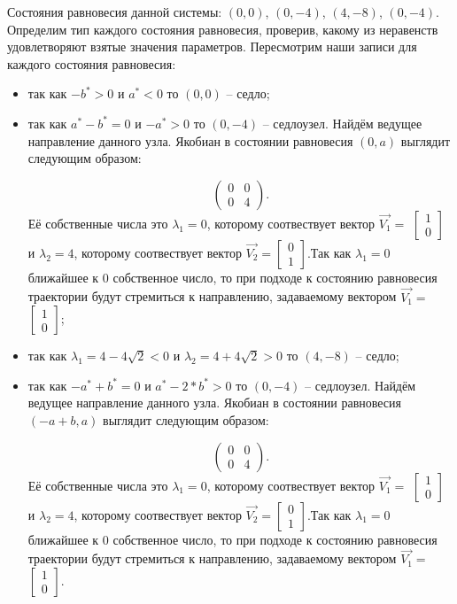 Состояния равновесия данной системы: $(0, 0)$, $(0, -4)$, $(4, -8)$, $(0, -4)$. Определим тип каждого состояния равновесия, проверив, какому из неравенств удовлетворяют взятые значения параметров.  Пересмотрим наши записи для каждого состояния равновесия: 
\begin{itemize}
	\item{ так как $-b^\ast > 0 $ и $a^\ast  < 0 $ то $(0, 0)$ -- седло;}
	\item{ так как $a^\ast - b^\ast = 0 $ и $-a^\ast > 0 $ то $(0, -4)$ -- седлоузел. Найдём ведущее направление данного узла. Якобиан в состоянии равновесия $(0, a)$ выглядит следующим образом:
		
		$$\begin{pmatrix}0 & 0\\0 & 4\end{pmatrix}. $$Её собственные числа это $\lambda_1=0$, которому соотвествует вектор $\Vec{V_1}=$ $\left[\begin{matrix}1\\0\end{matrix}\right]$ и $\lambda_2=4$, которому соотвествует вектор $\Vec{V_2}=$$\left[\begin{matrix}0\\1\end{matrix}\right]$.Так как $\lambda_1=0$ ближайшее к $0$ собственное число, то при подходе к состоянию равновесия траектории будут стремиться к направлению, задаваемому вектором $\Vec{V_1}=$ $\left[\begin{matrix}1\\0\end{matrix}\right]$;}
	\item{ так как ${\lambda_{1}} = 4 - 4 \sqrt{2}$$  < 0 $ и ${\lambda_{2}} = 4 + 4 \sqrt{2}$$ > 0 $ то $(4, -8)$ -- седло;}
	\item{ так как $-a^\ast + b^\ast = 0 $ и $a^\ast - 2*b^\ast > 0 $ то $(0, -4)$ -- седлоузел. Найдём ведущее направление данного узла. Якобиан в состоянии равновесия $(-a + b, a)$ выглядит следующим образом:
		
		$$\begin{pmatrix}0 & 0\\0 & 4\end{pmatrix}. $$Её собственные числа это $\lambda_1=0$, которому соотвествует вектор $\Vec{V_1}=$ $\left[\begin{matrix}1\\0\end{matrix}\right]$ и $\lambda_2=4$, которому соотвествует вектор $\Vec{V_2}=$$\left[\begin{matrix}0\\1\end{matrix}\right]$.Так как $\lambda_1=0$ ближайшее к $0$ собственное число, то при подходе к состоянию равновесия траектории будут стремиться к направлению, задаваемому вектором $\Vec{V_1}=$ $\left[\begin{matrix}1\\0\end{matrix}\right]$.}
\end{itemize} 

